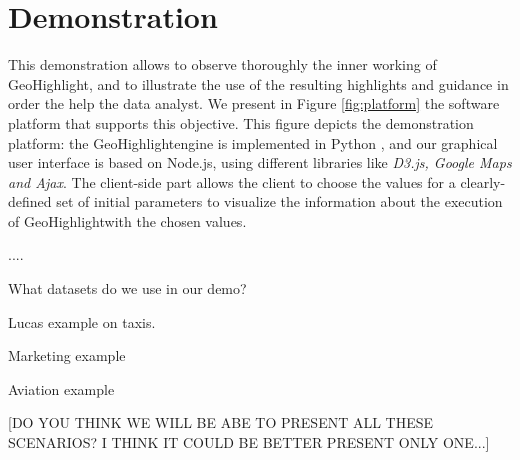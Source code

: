 \documentclass[conference]{IEEEtran}
\newcommand{\sys}{{\sc GeoHighlight}}
\begin{document}
\section{Demonstration}

This demonstration allows to observe thoroughly the inner working of \sys, and to illustrate the use of the
resulting highlights and guidance in order the help the data analyst. We present in Figure \ref{fig:platform} the software platform that supports this objective. This figure depicts the demonstration platform: the \sys engine is implemented in Python \cite{}, and our graphical user interface is based on Node.js, using different libraries like \textit{D3.js, Google Maps and Ajax}.  The client-side part allows the client to choose the values for a clearly-defined set of initial parameters to visualize the information about the execution of \sys with the chosen values. 

....


 What datasets do we use in our demo?

 Lucas example on taxis.

 Marketing example

 Aviation example 

[DO YOU THINK WE WILL BE ABE TO PRESENT ALL THESE SCENARIOS? I THINK IT COULD BE BETTER PRESENT ONLY ONE...]







\end{document}

